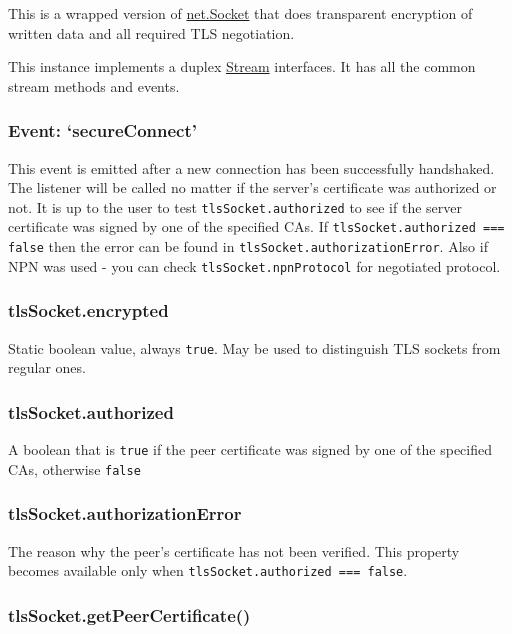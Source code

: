 This is a wrapped version of
\href{net.html\#net_class_net_socket}{net.Socket} that does transparent
encryption of written data and all required TLS negotiation.

This instance implements a duplex
\href{stream.html\#stream_stream}{Stream} interfaces. It has all the
common stream methods and events.

\subsubsection{Event: `secureConnect'}\label{event-secureconnect}

This event is emitted after a new connection has been successfully
handshaked. The listener will be called no matter if the server's
certificate was authorized or not. It is up to the user to test
\texttt{tlsSocket.authorized} to see if the server certificate was
signed by one of the specified CAs. If
\texttt{tlsSocket.authorized === false} then the error can be found in
\texttt{tlsSocket.authorizationError}. Also if NPN was used - you can
check \texttt{tlsSocket.npnProtocol} for negotiated protocol.

\subsubsection{tlsSocket.encrypted}\label{tlssocket.encrypted}

Static boolean value, always \texttt{true}. May be used to distinguish
TLS sockets from regular ones.

\subsubsection{tlsSocket.authorized}\label{tlssocket.authorized}

A boolean that is \texttt{true} if the peer certificate was signed by
one of the specified CAs, otherwise \texttt{false}

\subsubsection{tlsSocket.authorizationError}\label{tlssocket.authorizationerror}

The reason why the peer's certificate has not been verified. This
property becomes available only when
\texttt{tlsSocket.authorized === false}.

\subsubsection{tlsSocket.getPeerCertificate()}\label{tlssocket.getpeercertificate}

